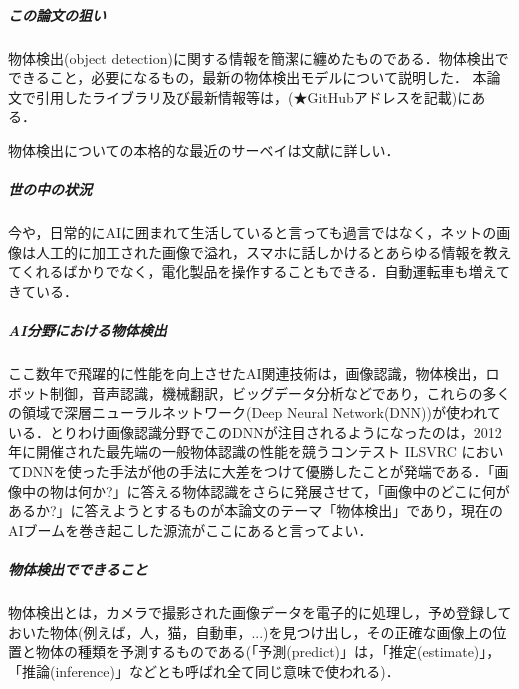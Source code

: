 \documentclass[twocolumn]{jsarticle} %
\begin{document}
\subparagraph{この論文の狙い} 物体検出(object detection)に関する情報を簡潔に纏めたものである．物体検出でできること，必要になるもの，最新の物体検出モデルについて説明した．
本論文で引用したライブラリ及び最新情報等は，(★GitHubアドレスを記載)にある．

物体検出についての本格的な最近のサーベイは文献\cite{JZLYLFQ19}に詳しい．

\subparagraph{世の中の状況} 
今や，日常的にAIに囲まれて生活していると言っても過言ではなく，ネットの画像は人工的に加工された画像で溢れ，スマホに話しかけるとあらゆる情報を教えてくれるばかりでなく，電化製品を操作することもできる．自動運転車も増えてきている．

\subparagraph{AI分野における物体検出} ここ数年で飛躍的に性能を向上させたAI関連技術は，画像認識，物体検出，ロボット制御，音声認識，機械翻訳，ビッグデータ分析などであり，これらの多くの領域で深層ニューラルネットワーク(Deep Neural Network(DNN))が使われている．とりわけ画像認識分野でこのDNNが注目されるようになったのは，2012年に開催された最先端の一般物体認識の性能を競うコンテスト ILSVRC においてDNNを使った手法が他の手法に大差をつけて優勝したことが発端である．「画像中の物は何か?」に答える物体認識をさらに発展させて，「画像中のどこに何があるか?」に答えようとするものが本論文のテーマ「物体検出」であり，現在のAIブームを巻き起こした源流がここにあると言ってよい．

\subparagraph{物体検出でできること} 物体検出とは，カメラで撮影された画像データを電子的に処理し，予め登録しておいた物体(例えば，人，猫，自動車，...)を見つけ出し，その正確な画像上の位置と物体の種類を予測するものである(「予測(predict)」は，「推定(estimate)」，「推論(inference)」などとも呼ばれ全て同じ意味で使われる)．
\end{document}
